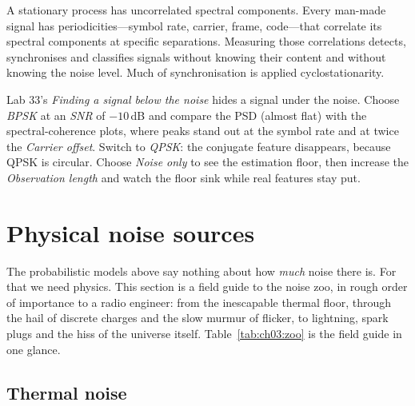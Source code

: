 \begin{keyidea}
A stationary process has uncorrelated spectral components. Every man-made signal has
periodicities---symbol rate, carrier, frame, code---that correlate its spectral components at specific
separations. Measuring those correlations detects, synchronises and classifies signals without knowing
their content and without knowing the noise level. Much of synchronisation is applied
cyclostationarity.
\end{keyidea}

\begin{tryit}
Lab 33's \emph{Finding a signal below the noise} hides a signal under the noise. Choose
\emph{BPSK} at an \emph{SNR} of $-10$\,dB and compare the PSD (almost flat) with the spectral-coherence
plots, where peaks stand out at the symbol rate and at twice the \emph{Carrier offset}. Switch to
\emph{QPSK}: the conjugate feature disappears, because QPSK is circular. Choose \emph{Noise only} to see
the estimation floor, then increase the \emph{Observation length} and watch the floor sink while real
features stay put.
\end{tryit}


\section{Physical noise sources}
\label{sec:ch03:physical}

The probabilistic models above say nothing about how \emph{much} noise there is. For that we need
physics. This section is a field guide to the noise zoo, in rough order of importance to a radio
engineer: from the inescapable thermal floor, through the hail of discrete charges and the slow
murmur of flicker, to lightning, spark plugs and the hiss of the universe itself.
Table~\ref{tab:ch03:zoo} is the field guide in one glance.

\subsection{Thermal noise}
\label{sec:ch03:thermal}


